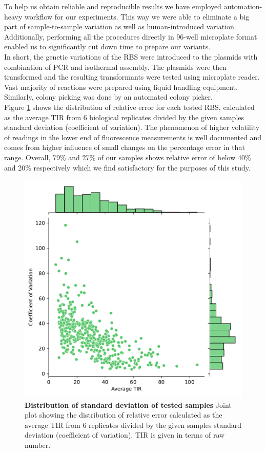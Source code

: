 \documentclass{article}
\begin{document}
To help us obtain reliable and reproducible results we have employed automation-heavy workflow for our experiments.
This way we were able to eliminate a big part of sample-to-sample variation as well as human-introduced variation.
Additionally, performing all the procedures directly in 96-well microplate format enabled us to significantly cut down time to prepare our variants.\\
In short, the genetic variations of the RBS were introduced to the plasmids with combination of PCR and isothermal assembly. 
The plasmids were then transformed and the resulting transformants were tested using microplate reader.
Vast majority of reactions were prepared using liquid handling equipment.
Similarly, colony picking was done by an automated colony picker.\\
Figure \ref{fig: SD} shows the distribution of relative error for each tested RBS, calculated as the average TIR from 6 biological replicates divided by the given samples standard deviation (coefficient of variation).
The phenomenon of higher volatility of readings in the lower end of fluorescence measurements is well documented and comes from higher influence of small changes on the percentage error in that range.
Overall, 79\% and 27\% of our samples shows relative error of below 40\% and 20\% respectively which we find satisfactory for the purposes of this study.\\


\begin{figure}[h]
    \centering
    \includegraphics[scale=0.75]{plots/Main_Paper/SD.pdf}
    \caption{\textbf{Distribution of standard deviation of tested samples} Joint plot showing the distribution of relative error calculated as the average TIR from 6 replicates divided by the given samples standard deviation (coefficient of variation). TIR is given in terms of raw number.}
    \label{fig: SD}
\end{figure}
\end{document}
